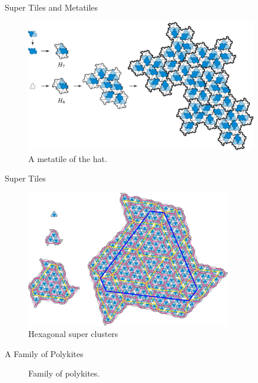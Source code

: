 \documentclass{beamer}
\begin{document}
    

\begin{frame}{Super Tiles and Metatiles}
    \begin{figure}
        \centering
        \includegraphics[page=1,width=0.9\textwidth]{images/aperiodic-pdfs/alt_subst.pdf}
        \caption{A metatile of the hat. \cite{Smith_2024}}
        \label{fig:hat-metatile}
    \end{figure}
\end{frame}

\begin{frame}{Super Tiles}
    \begin{figure}
        \centering
        \includegraphics[page=1,width=0.8\textwidth]{images/aperiodic-pdfs/hexclusters.pdf}
        \caption{Hexagonal super clusters\cite{Smith_2024}}
        \label{fig:hex-superculsters}
    \end{figure}
\end{frame}

\begin{frame}{A Family of Polykites}
    \begin{figure}
        \centering
        
        \caption{Family of polykites. \cite{Smith_2024}}
        \label{fig:other-polykites}
    \end{figure}
\end{frame}
\end{document}
